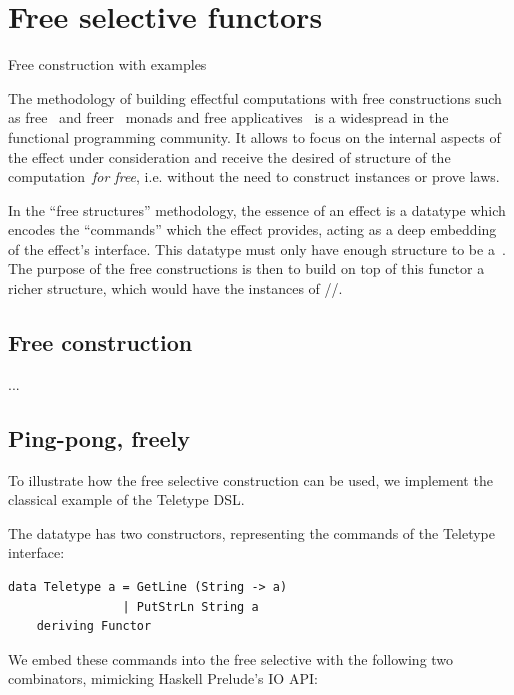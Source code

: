 \section{Free selective functors}\label{sec-free}

Free construction with examples

The methodology of building effectful computations with free constructions such
as free~\cite{free-monads} and freer~\cite{freer-monads} monads and free
applicatives~\cite{free-applicatives} is a widespread in the functional programming community.
It allows to focus on the internal aspects of the effect under consideration and receive the
desired  of  structure of the computation~\emph{for free},
i.e. without the need to construct instances or prove laws.

In the ``free structures'' methodology, the essence of an effect is a datatype which encodes
the ``commands'' which the effect provides, acting as a deep embedding of the effect's
interface. This datatype must only have enough structure to be a~. The purpose of
the free constructions is then to build on top of this functor a richer structure,
which would have the instances of //.

\subsection{Free construction}\label{sec-free-construction}

...

\subsection{Ping-pong, freely}\label{sec-free-ping-pong}

To illustrate how the free selective construction can be used, we implement the
classical example of the Teletype DSL.

The  datatype has two constructors, representing the commands of the
Teletype interface:

\begin{verbatim}
data Teletype a = GetLine (String -> a)
                | PutStrLn String a
    deriving Functor
\end{verbatim}

We embed these commands into the free selective with the following two combinators,
mimicking Haskell Prelude's IO API:

